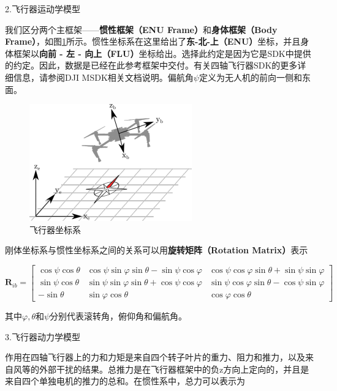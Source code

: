 2.飞行器运动学模型

我们区分两个主框架——\textbf{惯性框架（ENU Frame）}和\textbf{身体框架（Body Frame）}，如图\ref{Fig:img-append10}所示。惯性坐标系在这里给出了\textbf{东-北-上（ENU）}坐标，并且身体框架以\textbf{向前 - 左 - 向上（FLU）}坐标给出。选择此约定是因为它是SDK中提供的约定。因此，数据是已经在此参考框架中交付。有关四轴飞行器SDK的更多详细信息，请参阅DJI MSDK相关文档说明。偏航角$\psi$定义为无人机的前向一侧和东面。

\begin{figure}[ht]
  \centering
  \includegraphics[width=0.8\linewidth]{./Figure/Drone_Coordinate_System.png}
  \caption{飞行器坐标系}\label{Fig:img-append10}
\end{figure}

刚体坐标系与惯性坐标系之间的关系可以用\textbf{旋转矩阵（Rotation Matrix）}表示

\begin{equation}
\boldsymbol{R}_{i b}=\left[\begin{array}{ccc}
\cos \psi \cos \theta & \cos \psi \sin \varphi \sin \theta-\sin \psi \cos \varphi & \cos \psi \cos \varphi \sin \theta+\sin \psi \sin \varphi \\
\sin \psi \cos \theta & \sin \psi \sin \varphi \sin \theta+\cos \psi \cos \varphi & \sin \psi \cos \varphi \sin \theta-\cos \psi \sin \varphi \\
-\sin \theta & \sin \varphi \cos \theta & \cos \varphi \cos \theta
\end{array}\right]
\end{equation}

其中$\varphi, \theta$和$\psi$分别代表滚转角，俯仰角和偏航角。

3.飞行器动力学模型

作用在四轴飞行器上的力和力矩是来自四个转子叶片的重力、阻力和推力，以及来自风等的外部干扰的结果。总推力是在飞行器框架中的负z方向上定向的，并且是来自四个单独电机的推力的总和。在惯性系中，总力可以表示为

